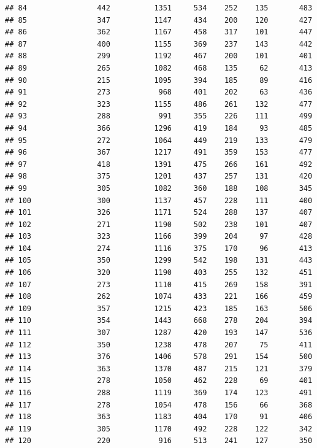 \documentclass[]{book}
\begin{document}
\begin{verbatim}
## 84                442          1351     534    252    135       483
## 85                347          1147     434    200    120       427
## 86                362          1167     458    317    101       447
## 87                400          1155     369    237    143       442
## 88                299          1192     467    200    101       401
## 89                265          1082     468    135     62       413
## 90                215          1095     394    185     89       416
## 91                273           968     401    202     63       436
## 92                323          1155     486    261    132       477
## 93                288           991     355    226    111       499
## 94                366          1296     419    184     93       485
## 95                272          1064     449    219    133       479
## 96                367          1217     491    359    153       477
## 97                418          1391     475    266    161       492
## 98                375          1201     437    257    131       420
## 99                305          1082     360    188    108       345
## 100               300          1137     457    228    111       400
## 101               326          1171     524    288    137       407
## 102               271          1190     502    238    101       407
## 103               323          1166     399    204     97       428
## 104               274          1116     375    170     96       413
## 105               350          1299     542    198    131       443
## 106               320          1190     403    255    132       451
## 107               273          1110     415    269    158       391
## 108               262          1074     433    221    166       459
## 109               357          1215     423    185    163       506
## 110               354          1443     668    278    204       394
## 111               307          1287     420    193    147       536
## 112               350          1238     478    207     75       411
## 113               376          1406     578    291    154       500
## 114               363          1370     487    215    121       379
## 115               278          1050     462    228     69       401
## 116               288          1119     369    174    123       491
## 117               278          1054     478    156     66       368
## 118               363          1183     404    170     91       406
## 119               305          1170     492    228    122       342
## 120               220           916     513    241    127       350

\end{verbatim}
\end{document}
